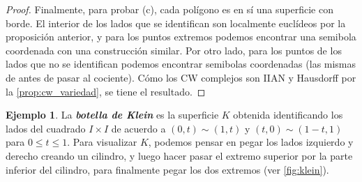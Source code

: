 \documentclass[10pt]{report}
\newcommand{\enfatiza}[1]{\textbf{\textit{#1}}}
\theoremstyle{definition}
\newtheorem{eje}[defin]{Ejemplo}
\begin{document}
\begin{proof}
Finalmente, para probar (c), cada polígono es en sí una superficie con borde. El interior de los lados que se identifican son localmente euclídeos por la proposición anterior, y para los puntos extremos podemos encontrar una semibola coordenada con una construcción similar. Por otro lado, para los puntos de los lados que no se identifican podemos encontrar semibolas coordenadas (las mismas de antes de pasar al cociente). Cómo los CW complejos son IIAN y Hausdorff por la \autoref{prop:cw_variedad}, se tiene el resultado.
\end{proof}

\begin{eje}%
La \enfatiza{botella de Klein} es la superficie $K$ obtenida identificando los lados del cuadrado $I\times I$ de acuerdo a $(0,t)\sim (1,t)$ y $(t,0)\sim (1-t,1)$ para $0\leq t\leq 1$.  Para visualizar $K$, podemos pensar en pegar los lados izquierdo y derecho creando un cilindro, y luego hacer pasar el extremo superior por la parte inferior del cilindro, para finalmente pegar los dos extremos (ver \autoref{fig:klein}).
\end{eje}
\end{document}
